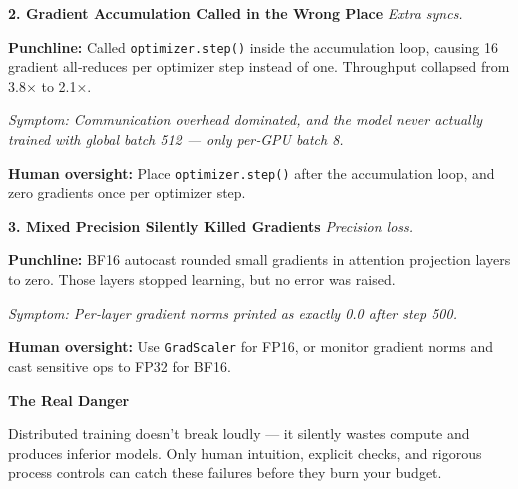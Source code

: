 \documentclass[11pt]{article}
\begin{document}
\begin{infobox}[top=5pt, bottom=5pt, left=10pt, right=10pt]
{\normalsize\color{brandblue}\textbf{2. Gradient Accumulation Called in the Wrong Place}} \hfill {\footnotesize\color{brandorange}\textit{Extra syncs.}}

\vspace{0.03in}
{\footnotesize\textbf{Punchline:} Called \texttt{optimizer.step()} inside the accumulation loop, causing 16 gradient all‑reduces per optimizer step instead of one. Throughput collapsed from 3.8× to 2.1×.}

\vspace{0.02in}
{\footnotesize\color{brandgray}\textit{Symptom: Communication overhead dominated, and the model never actually trained with global batch 512 — only per‑GPU batch 8.}}

\vspace{0.02in}
{\footnotesize\color{brandred}\textbf{Human oversight:} Place \texttt{optimizer.step()} after the accumulation loop, and zero gradients once per optimizer step.}
\end{infobox}

\vspace{0.15in}

\begin{infobox}[top=5pt, bottom=5pt, left=10pt, right=10pt]
{\normalsize\color{brandblue}\textbf{3. Mixed Precision Silently Killed Gradients}} \hfill {\footnotesize\color{brandorange}\textit{Precision loss.}}

{\footnotesize\textbf{Punchline:} BF16 autocast rounded small gradients in attention projection layers to zero. Those layers stopped learning, but no error was raised.}

\vspace{0.02in}
{\footnotesize\color{brandgray}\textit{Symptom: Per‑layer gradient norms printed as exactly 0.0 after step 500.}}

\vspace{0.02in}
{\footnotesize\color{brandred}\textbf{Human oversight:} Use \texttt{GradScaler} for FP16, or monitor gradient norms and cast sensitive ops to FP32 for BF16.}
\end{infobox}

\vspace{0.2in}

\begin{darkbox}[top=5pt, bottom=5pt, left=10pt, right=10pt]
{\normalsize\textbf{The Real Danger}}

\vspace{0.03in}
{\footnotesize Distributed training doesn't break loudly — it silently wastes compute and produces inferior models. Only human intuition, explicit checks, and rigorous process controls can catch these failures before they burn your budget.}
\end{darkbox}
\end{document}
